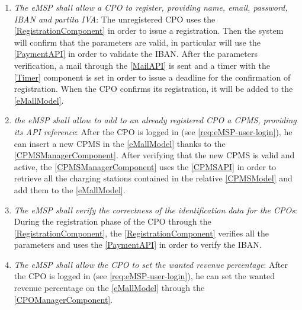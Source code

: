 \begin{enumerate}[label=\textbf{R\arabic*}]
            \label{req:eMSP-compatible}
      \item \textit{The \ac{eMSP} shall allow a \ac{CPO} to register, providing name, email, password, \ac{IBAN} and \gls{partita IVA}}:
            The unregistered \ac{CPO} uses the \ref{RegistrationComponent} in order to issue a registration.
            Then the system will confirm that the parameters are valid, in particular will use the \ref{PaymentAPI} in order to validate the \ac{IBAN}.
            After the parameters verification, a mail through the \ref{MailAPI} is sent and a timer with the \ref{Timer} component is set in order to issue a deadline for the confirmation of registration.
            When the \ac{CPO} confirms its registration, it will be added to the \ref{eMallModel}.
            \label{req:eMSP-cpo-registration}
      \item \textit{the \ac{eMSP} shall allow to add to an already registered \ac{CPO} a \ac{CPMS}, providing its \ac{API} reference}:
            After the \ac{CPO} is logged in (see \ref{req:eMSP-user-login}), he can insert a new \ac{CPMS} in the \ref{eMallModel} thanks to the \ref{CPMSManagerComponent}. After verifying that the new \ac{CPMS} is valid and active, the \ref{CPMSManagerComponent} uses the \ref{CPMSAPI} in order to retrieve all the charging stations contained in the relative \ref{CPMSModel} and add them to the \ref{eMallModel}.
            \label{req:eMSP-add-cpms}
      \item \textit{The \ac{eMSP} shall verify the correctness of the identification data for the \acp{CPO}}:
            During the registration phase of the \ac{CPO} through the \ref{RegistrationComponent}, the \ref{RegistrationComponent} verifies all the parameters and uses the \ref{PaymentAPI} in order to verify the \ac{IBAN}.
            \label{req:eMSP-correct-cpo-info}
      \item \textit{The \ac{eMSP} shall allow the \ac{CPO} to set the wanted revenue percentage}:
            After the \ac{CPO} is logged in (see \ref{req:eMSP-user-login}), he can set the wanted revenue percentage on the \ref{eMallModel} through the \ref{CPOManagerComponent}.

\end{enumerate}
